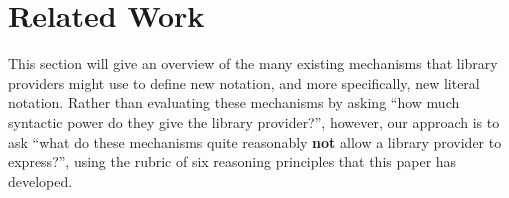 \documentclass[acmsmall]{acmart}
\newcommand{\li}[1]{\lstinline[basicstyle=\ttfamily\fontsize{9pt}{1em}\selectfont]{#1}}
\begin{document}




\section{Related Work}
\label{sec:existing-approaches}

This section will give an overview of the many existing mechanisms that library providers might use to define new notation, and more specifically, new literal notation. Rather than evaluating these mechanisms by asking ``how much syntactic power do they give the library provider?'', however, our approach is to ask ``what do these mechanisms quite reasonably \textbf{not} allow a library provider to express?'', using the rubric of six reasoning principles that this paper has developed.
\end{document}
